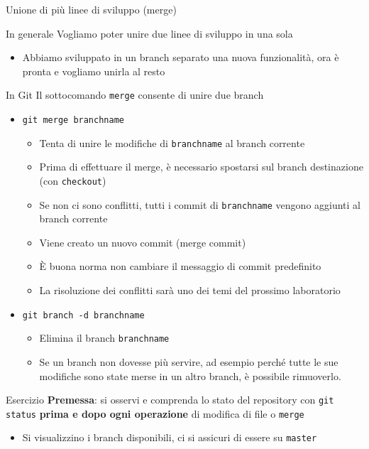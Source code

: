 \documentclass[xcolor=dvipsnames,presentation]{beamer}
\begin{document}
\begin{frame}{Unione di più linee di sviluppo (merge)}
	\begin{block}{In generale}
		Vogliamo poter unire due linee di sviluppo in una sola
		\begin{itemize}
			\item Abbiamo sviluppato in un branch separato una nuova funzionalità, ora è pronta e vogliamo unirla al resto
		\end{itemize}
	\end{block}
	\begin{block}{In Git}
		Il sottocomando \texttt{merge} consente di unire due branch
		\begin{itemize}
			\item \texttt{git merge branchname}
			\begin{itemize}
				\item Tenta di unire le modifiche di \texttt{branchname} al branch corrente
				\item Prima di effettuare il merge, è necessario spostarsi sul branch destinazione (con \texttt{checkout})
				\item Se non ci sono conflitti, tutti i commit di \texttt{branchname} vengono aggiunti al branch corrente
				\item Viene creato un nuovo commit (merge commit)
				\item È buona norma non cambiare il messaggio di commit predefinito
				\item La risoluzione dei conflitti sarà uno dei temi del prossimo laboratorio
			\end{itemize}
			\item \texttt{git branch -d branchname}
			\begin{itemize}
				\item Elimina il branch \texttt{branchname}
				\item Se un branch non dovesse più servire, ad esempio perché tutte le sue modifiche sono state merse in un altro branch, è possibile rimuoverlo.
			\end{itemize}
		\end{itemize}
	\end{block}
	\begin{block}{Esercizio}
		\textbf{Premessa}: si osservi e comprenda lo stato del repository con \texttt{git status} \textbf{prima e dopo ogni operazione} di modifica di file o \texttt{merge}
		\begin{itemize}
			\footnotesize
			\item Si visualizzino i branch disponibili, ci si assicuri di essere su \texttt{master}

\end{itemize}
\end{block}
\end{frame}
\end{document}
